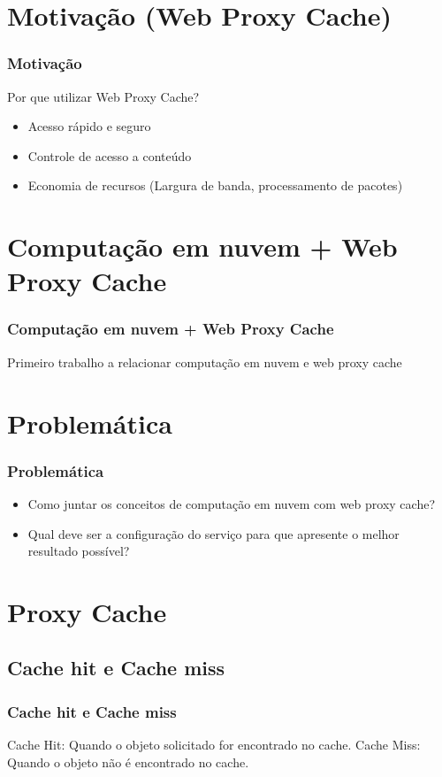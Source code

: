 \documentclass{beamer}
\begin{document}
    \section{Motivação (Web Proxy Cache)}
    \begin{frame}
      \frametitle{Motivação}
      Por que utilizar Web Proxy Cache?
      \begin{itemize}
       \item <2-> Acesso rápido e seguro
       \item <3-> Controle de acesso a conteúdo
       \item <4-> Economia de recursos (Largura de banda, processamento de pacotes)
      \end{itemize}
    \end{frame}
    \section{Computação em nuvem + Web Proxy Cache}
    \begin{frame}
     \frametitle{Computação em nuvem + Web Proxy Cache}
     Primeiro trabalho a relacionar computação em nuvem e web proxy cache
    \end{frame}
    \section{Problemática}
    \begin{frame}
     \frametitle{Problemática}
     \begin{itemize}
       \item Como juntar os conceitos de computação em nuvem com web proxy cache?
       \item Qual deve ser a configuração do serviço para que apresente o melhor resultado possível?
      \end{itemize}
    \end{frame}
    \section{Proxy Cache}
    \subsection{Cache hit e Cache miss}
    \begin{frame}
      \frametitle{Cache hit e Cache miss}
      Cache Hit: Quando o objeto solicitado for encontrado no cache.
      Cache Miss: Quando o objeto não é encontrado no cache.
    \end{frame}
\end{document}
